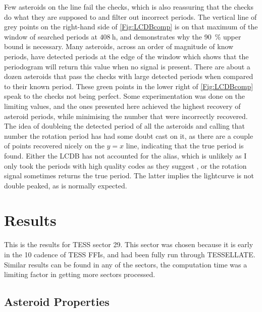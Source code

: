 \documentclass{UCreport}
\begin{document}
Few asteroids on the line fail the checks, which is also reassuring that the checks do what they are supposed to and filter out incorrect periods.
The vertical line of grey points on the right-hand side of \autoref{Fig:LCDBcomp} is on that maximum of the window of searched periods at $\qty{408}{\hour}$, and demonstrates why the \qty{90}{\percent} upper bound is necessary.
Many asteroids, across an order of magnitude of know periods, have detected periods at the edge of the window which shows that the periodogram will return this value when no signal is present.
There are about a dozen asteroids that pass the checks with large detected periods when compared to their known period. These green points in the lower right of \autoref{Fig:LCDBcomp} speak to the checks not being perfect.
Some experimentation was done on the limiting values, and the ones presented here achieved the highest recovery of asteroid periods, while minimising the number that were incorrectly recovered.
The idea of doubleing the detected period of all the asteroids and calling that number the rotation period has had some doubt cast on it, as there are a couple of points recovered nicely on the $y=x$ line, indicating that the true period is found.
Either the LCDB has not accounted for the alias, which is unlikely as I only took the periods with high quality codes as they suggest \citep{Warner2009}, or the rotation signal sometimes returns the true period.
The latter implies the lightcurve is not double peaked, as is normally expected.


\section{Results}\label{Sec:Res}

This is the results for TESS sector 29.
This sector was chosen because it is early in the \qty{10}{\min} cadence of TESS FFIs, and had been fully run through TESSELLATE.
Similar results can be found in any of the sectors, the computation time was a limiting factor in getting more sectors processed.

\subsection{Asteroid Properties}\label{SubSec:AstPropRes}
\end{document}
